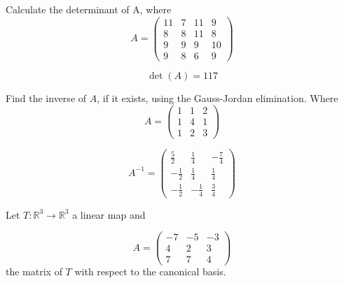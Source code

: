 \begin{questions}

\question Calculate the determinant of A, where
$$
A=\left(\begin{array}{rrrr}
11 & 7 & 11 & 9 \\
8 & 8 & 11 & 8 \\
9 & 9 & 9 & 10 \\
9 & 8 & 6 & 9
\end{array}\right)
$$

\begin{solution}
$$\det(A)=117$$
\end{solution}

\question Find the inverse of $A$, if it exists, using the Gauss-Jordan elimination. Where
$$
A=\left(\begin{array}{rrr}
1 & 1 & 2 \\
1 & 4 & 1 \\
1 & 2 & 3
\end{array}\right)
$$

\begin{solution}
$$A^{-1}=\left(\begin{array}{rrr}
\frac{5}{2} & \frac{1}{4} & -\frac{7}{4} \\
-\frac{1}{2} & \frac{1}{4} & \frac{1}{4} \\
-\frac{1}{2} & -\frac{1}{4} & \frac{3}{4}
\end{array}\right)$$
\end{solution}

\question Let $T:\mathbb{R}^3\rightarrow\mathbb{R}^3$  a linear map and
 
$$
A=\left(\begin{array}{rrr}
-7 & -5 & -3 \\
4 & 2 & 3 \\
7 & 7 & 4
\end{array}\right)
$$
the matrix of $T$ with respect to the canonical basis.
\end{questions}
